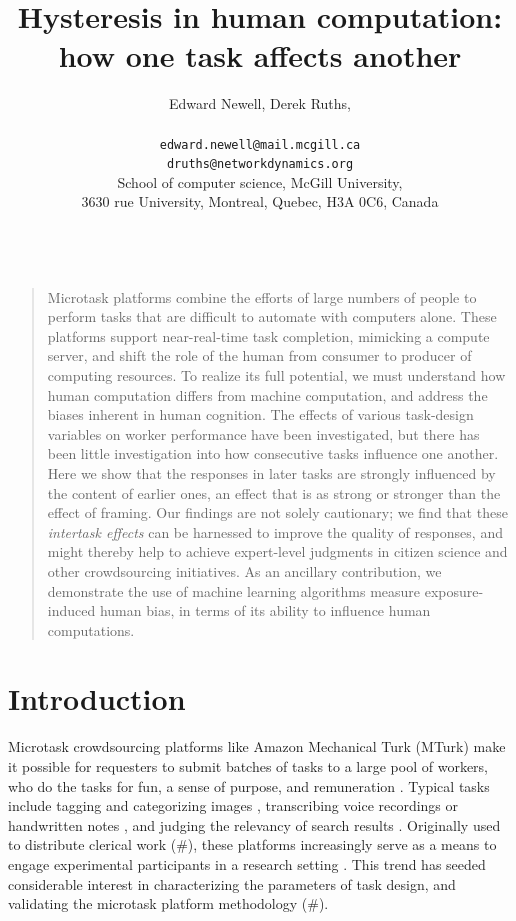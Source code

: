 \documentclass[12pt]{article}
\title{Hysteresis in human computation:\\ how one task affects another}
\author
{Edward Newell, Derek Ruths,\\
\\
\normalsize{\texttt{edward.newell@mail.mcgill.ca}}\\
\normalsize{\texttt{druths@networkdynamics.org}}\\
\normalsize{School of computer science, McGill University,}\\
\normalsize{3630 rue University, Montreal, Quebec, H3A 0C6, Canada}\\
\\
}
\date{}
\newenvironment{sciabstract}{%
\begin{quote} \bf}
{\end{quote}}
\begin{document}
 


\baselineskip24pt


\maketitle 




\begin{sciabstract}

Microtask platforms combine the efforts of large numbers 
of people to perform tasks that are difficult to automate with computers 
alone.  These platforms support near-real-time task completion, mimicking a
compute server, and shift the role of the human from consumer to 
producer of computing resources.  To realize its full
potential, we must understand how human computation differs from machine 
computation, and address the biases inherent in 
human cognition.  The effects of various task-design variables on worker
performance have been investigated, but there has been little 
investigation into how consecutive tasks influence one another. Here we show 
that the responses in later tasks are strongly influenced by the content of 
earlier ones, an effect that is as strong or stronger than the effect of 
framing.  Our findings are not solely cautionary; we find
that these \textit{intertask effects} can be harnessed to improve the quality 
of responses, and might thereby help to achieve expert-level judgments in 
citizen science and other crowdsourcing initiatives. 
As an ancillary contribution, we demonstrate the use of machine learning 
algorithms measure exposure-induced human bias, in terms of its ability to 
influence human computations. 
\end{sciabstract}

\section*{Introduction}
Microtask crowdsourcing platforms like Amazon Mechanical Turk (MTurk) make it 
possible for requesters to submit batches of tasks to a large pool of 
workers, who do the tasks for fun, a sense of purpose, and remuneration 
\cite{kazai2013analysis,Antin20122925}.  
Typical tasks include tagging and categorizing images 
\cite{6116320,Zhai2012357}, transcribing voice recordings 
\cite{chandler2013breaking,paolacci2010running}
or handwritten notes \cite{Berinsky2012351,Finnerty2013}, and judging the 
relevancy of search results 
\cite{le2010ensuring,grady2010crowdsourcing,alonso2009can,kazai2013analysis}.
Originally used to distribute clerical work (\#), these platforms 
increasingly serve as a means to engage experimental participants in a 
research 
setting \cite{paolacci2010running,Berinsky2012351,snow2008cheap,alonso2009can}.
This trend has seeded considerable interest in characterizing the parameters
of task design, and validating the microtask platform methodology (\#).
\end{document}
